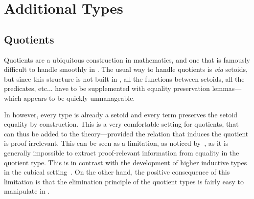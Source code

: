 \section{Additional Types}
\label{sec:extensions}

\subsection{Quotients}

Quotients are a ubiquitous construction in mathematics, and one that
is famously difficult to handle smoothly in \MLTT.
%
The usual way to handle quotients is \textit{via} setoids, but since
this structure is not built in \MLTT, all the functions between
setoids, all the predicates, etc... have to be supplemented with
equality preservation lemmas---which appears to be quickly unmanageable.

In \SetoidTT however, every type is already a setoid and every term
preserves the setoid equality by construction. This is a very
comfortable setting for quotients, that can thus be added to the
theory---provided the relation that induces the quotient is
proof-irrelevant.
%
This can be seen as a limitation, as noticed
by~, as it is generally
impossible to extract proof-relevant information from equality in
the quotient type. This is in contrast with the development of higher
inductive types in the cubical setting~.
%
On the other hand, the positive consequence of this limitation is
that the elimination principle of the quotient types is fairly easy to
manipulate in \SetoidTT.

